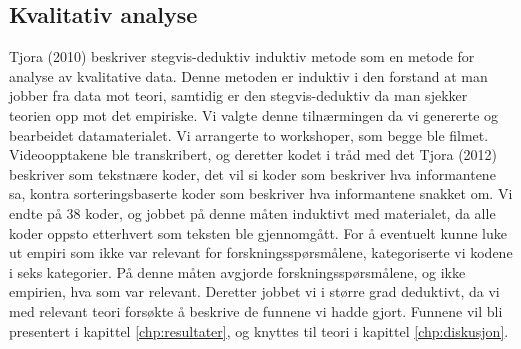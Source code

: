 \subsection{Kvalitativ analyse}
Tjora (2010) beskriver stegvis-deduktiv induktiv metode som en metode for analyse av kvalitative data. Denne metoden er induktiv i den forstand at man jobber fra data mot teori, samtidig er den stegvis-deduktiv da man sjekker teorien opp mot det empiriske. Vi valgte denne tilnærmingen da vi genererte og bearbeidet datamaterialet.
Vi arrangerte to workshoper, som begge ble filmet. Videoopptakene ble transkribert, og deretter kodet i tråd med det Tjora (2012) beskriver som tekstnære koder, det vil si koder som beskriver hva informantene sa, kontra sorteringsbaserte koder som beskriver hva informantene snakket om. Vi endte på 38 koder, og jobbet på denne måten induktivt med materialet, da alle koder oppsto etterhvert som teksten ble gjennomgått. For å eventuelt kunne luke ut empiri som ikke var relevant for forskningsspørsmålene, kategoriserte vi kodene i seks kategorier. På denne måten avgjorde forskningsspørsmålene, og ikke empirien, hva som var relevant. Deretter jobbet vi i større grad deduktivt, da vi med relevant teori forsøkte å beskrive de funnene vi hadde gjort. Funnene vil bli presentert i kapittel \ref{chp:resultater}, og knyttes til teori i kapittel \ref{chp:diskusjon}.



